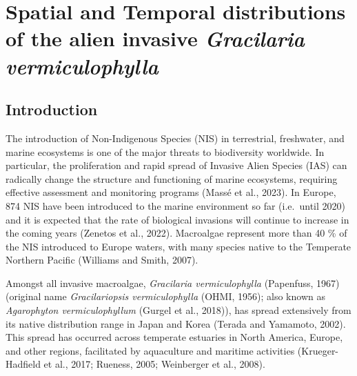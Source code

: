 \documentclass[
  letterpaper,
  11pt,
  english,
  singlespacing,
  headsepline]{MastersDoctoralThesis}
\begin{document}
\newpage\null\thispagestyle{empty}\newpage


\chapter{\texorpdfstring{Spatial and Temporal distributions of the alien
invasive \emph{Gracilaria
vermiculophylla}}{Spatial and Temporal distributions of the alien invasive Gracilaria vermiculophylla}}\label{spatial-and-temporal-distributions-of-the-alien-invasive-gracilaria-vermiculophylla}

\begin{spacing}{1.5}

\section{Introduction}\label{introduction-3}

The introduction of Non-Indigenous Species (NIS) in terrestrial,
freshwater, and marine ecosystems is one of the major threats to
biodiversity worldwide. In particular, the proliferation and rapid
spread of Invasive Alien Species (IAS) can radically change the
structure and functioning of marine ecosystems, requiring effective
assessment and monitoring programs (Massé et al., 2023). In Europe, 874
NIS have been introduced to the marine environment so far (i.e.~until
2020) and it is expected that the rate of biological invasions will
continue to increase in the coming years (Zenetos et al., 2022).
Macroalgae represent more than 40 \% of the NIS introduced to Europe
waters, with many species native to the Temperate Northern Pacific
(Williams and Smith, 2007).

Amongst all invasive macroalgae, \emph{Gracilaria vermiculophylla}
(Papenfuss, 1967) (original name \emph{Gracilariopsis vermiculophylla}
(OHMI, 1956); also known as \emph{Agarophyton vermiculophyllum} (Gurgel
et al., 2018)), has spread extensively from its native distribution
range in Japan and Korea (Terada and Yamamoto, 2002). This spread has
occurred across temperate estuaries in North America, Europe, and other
regions, facilitated by aquaculture and maritime activities
(Krueger-Hadfield et al., 2017; Rueness, 2005; Weinberger et al., 2008).


\end{spacing}
\end{document}
